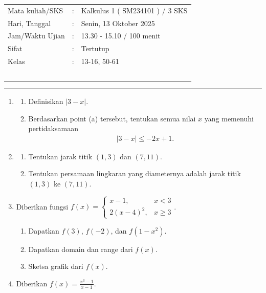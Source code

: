 \documentclass[10pt,openany,a4paper]{article}
\theoremstyle{definition}
\theoremstyle{definition}
\theoremstyle{plain}
\begin{document}
    \begin{center}
	\begin{tabular}{lcl}
		Mata kuliah/SKS & : & Kalkulus 1 ( SM234101 ) / 3 SKS\\
		Hari, Tanggal & : & Senin, 13 Oktober 2025\\
		Jam/Waktu Ujian & : & 13.30 - 15.10 / 100 menit\\
		Sifat & : & Tertutup\\
		Kelas & : & 13-16, 50-61\\
  ~
	\end{tabular}
    
    \noindent\rule{\textwidth}{2.pt}
        \end{center}
        \begin{enumerate}
            \item \begin{enumerate}
                \item Definisikan $|3-x|$.
                \item Berdasarkan point (a) tersebut, tentukan semua nilai $x$ yang memenuhi pertidaksamaan 
                \begin{align*}
                    |3-x|\leq -2x+1.
                \end{align*}
            \end{enumerate}
            \item \begin{enumerate}
                \item Tentukan jarak titik $(1,3)$ dan $(7,11)$.
            \item Tentukan persamaan lingkaran yang diameternya adalah jarak titik $(1,3)$ ke $(7,11)$. 
            \end{enumerate}
            \item Diberikan fungsi $f(x)=\begin{cases}
                x-1, &x<3\\
                2(x-4)^2, &x\geq 3
            \end{cases}$.
            \begin{enumerate}
                \item Dapatkan $f(3)$, $f(-2)$, dan $f(1-x^2)$.
                \item Dapatkan domain dan range dari $f(x)$.
                \item Sketsa grafik dari $f(x)$.
            \end{enumerate}
            \item Diberikan $f(x)=\frac{x^3-1}{x-1}$.

\end{enumerate}
\end{document}
